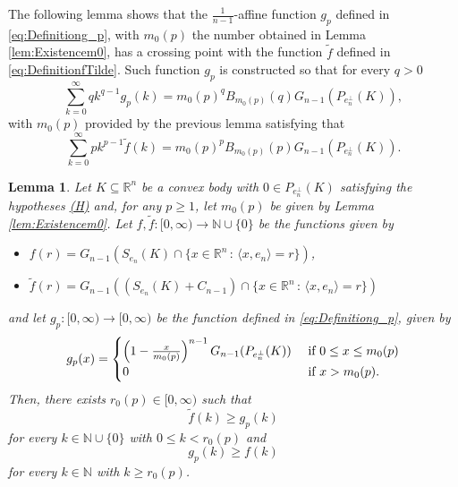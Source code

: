 \documentclass[10pt]{amsart}
\newtheorem{lemma}[thm]{Lemma}
\def\R{\mathbb{R}}
\def\N{\mathbb{N}}
\numberwithin{equation}{section}
\begin{document}
The following lemma shows that the $\frac{1}{n-1}$-affine function $g_p$ defined in \eqref{eq:Definitiong_p}, with $m_0(p)$ the number obtained in Lemma \ref{lem:Existencem0}, has a crossing point with the function $\tilde{f}$ defined in \eqref{eq:DefinitionfTilde}. Such function $g_p$ is constructed so that for every $q>0$
\begin{equation}\label{eq:Sumg_p}
\sum_{k=0}^\infty qk^{q-1}g_p(k)=m_0(p)^qB_{m_0(p)}(q)G_{n-1}(P_{e_n^\perp}(K)),
\end{equation}
with $m_0(p)$ provided by the previous lemma satisfying that
\begin{equation}\label{eq:m_0(p)}
\sum_{k=0}^{\infty} pk^{p-1}\tilde{f}(k)=m_0(p)^pB_{m_0(p)}(p)G_{n-1}(P_{e_n^\perp}(K)).
\end{equation}


\begin{lemma}\label{lem:existenceDiscreter0}
Let $K\subseteq\R^n$ be a convex body with $0\in P_{e_n^\perp}(K)$ satisfying the hypotheses \hyperlink{(H)}{\textrm{(H)}} and, for any $p\geq 1$, let $m_0(p)$ be given by Lemma \ref{lem:Existencem0}. Let $f,\tilde{f}:[0,\infty)\to\N\cup\{0\}$ be the functions given by
\begin{itemize}
\item $f(r)=G_{n-1}(S_{e_n}(K)\cap\{x\in\R^n\,:\,\langle x,e_n\rangle=r\})$,
\item $\tilde{f}(r)=G_{n-1}((S_{e_n}(K)+C_{n-1})\cap\{x\in\R^n\,:\,\langle x,e_n\rangle=r\})$
\end{itemize}
and let $g_p:[0,\infty)\to[0,\infty)$ be the function defined in \eqref{eq:Definitiong_p}, given by
$$
g_p(x)=\begin{cases}
\left(1-\frac{x}{m_0(p)}\right)^{n-1}G_{n-1}(P_{e_n^\perp}(K)) &\textrm{ if }0\leq x\leq m_0(p)\cr
0&\textrm{ if }x>m_0(p).\cr
\end{cases}
$$
Then, there exists $r_0(p)\in[0,\infty)$ such that
$$
\tilde{f}(k)\geq g_p(k)
$$
for every $k\in\N\cup\{0\}$ with $0\leq k< r_0(p)$ and
$$
g_p(k)\geq f(k)
$$
for every $k\in\N$ with $k\geq r_0(p)$.
\end{lemma}
\end{document}
